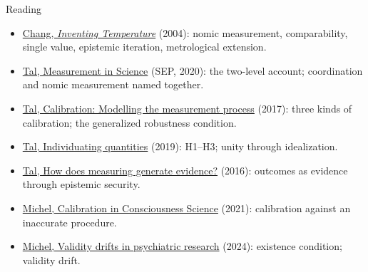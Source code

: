 \documentclass[aspectratio=169,11pt]{beamer}
\begin{document}
\begin{frame}[label=reading]{Reading}
\small
\begin{itemize}\setlength\itemsep{0pt}
  \item \href{https://academic.oup.com/book/5530}{Chang, \emph{Inventing Temperature}} (2004): nomic measurement, comparability, single value, epistemic iteration, metrological extension.
  \item \href{https://plato.stanford.edu/entries/measurement-science/}{Tal, Measurement in Science} (SEP, 2020): the two-level account; coordination and nomic measurement named together.
  \item \href{https://philpapers.org/rec/TALCMT}{Tal, Calibration: Modelling the measurement process} (2017): three kinds of calibration; the generalized robustness condition.
  \item \href{https://philpapers.org/rec/TALIQ}{Tal, Individuating quantities} (2019): H1--H3; unity through idealization.
  \item \href{https://iopscience.iop.org/article/10.1088/1742-6596/772/1/012001}{Tal, How does measuring generate evidence?} (2016): outcomes as evidence through epistemic security.
  \item \href{https://philpapers.org/archive/MICCIC-2.pdf}{Michel, Calibration in Consciousness Science} (2021): calibration against an inaccurate procedure.
  \item \href{https://580d4178-4a2a-40ee-b753-91905f0859e6.filesusr.com/ugd/b898ea_5e898d22d16b4ba89c07c379485770ed.pdf}{Michel, Validity drifts in psychiatric research} (2024): existence condition; validity drift.
\end{itemize}
\end{frame}
\end{document}
